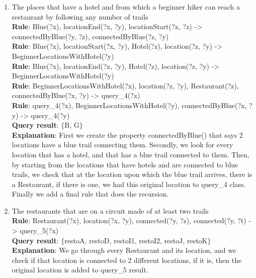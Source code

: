\documentclass[14pt]
{article}
\begin{document}
\begin{enumerate}
\item The places that have a hotel and from which a beginner hiker can reach a restaurant by following any number of trails \\
\textbf{Rule}: Blue(?x), locationEnd(?x, ?y), locationStart(?x, ?z) -> connectedByBlue(?y, ?z), connectedByBlue(?z, ?y)\\
\textbf{Rule}: Blue(?x), locationStart(?x, ?y), Hotel(?z), location(?z, ?y) -> BeginnerLocationsWithHotel(?y)\\
\textbf{Rule}: Blue(?x), locationEnd(?x, ?y), Hotel(?z), location(?z, ?y) -> BeginnerLocationsWithHotel(?y)\\
\textbf{Rule}: BeginnerLocationsWithHotel(?x), location(?z, ?y), Restaurant(?z), connectedByBlue(?x, ?y) -> query\_4(?x)\\
\textbf{Rule}: query\_4(?x), BeginnerLocationsWithHotel(?y), connectedByBlue(?x, ?y) -> query\_4(?y)\\
\textbf{Query result}: $\{$B, G$\}$\\
\textbf{Explanation}: First we create the property connectedByBlue() that says 2 locations have a blue trail connecting them. Secondly, we look for every location that has a hotel, and that has a blue trail connected to them. Then, by starting from the locations that have hotels and are connected to blue trails, we check that at the location upon which the blue trail arrives, there is a Restaurant, if there is one, we had this original location to query\_4 class. Finally we add a final rule that does the recursion.\\

\item The restaurants that are on a circuit made of at least two trails \\
\textbf{Rule}: Restaurant(?x), location(?x, ?y), connected(?y, ?z), connected(?y, ?t) -> query\_5(?x)\\
\textbf{Query result}: $\{$restoA, restoD, restoI1, restoI2, restoJ, restoK$\}$\\
\textbf{Explanation}: We go through every Restaurant and its location, and we check if that location is connected to 2 different locations, if it is, then the original location is added to query\_5 result.\\


\end{enumerate}
\end{document}
